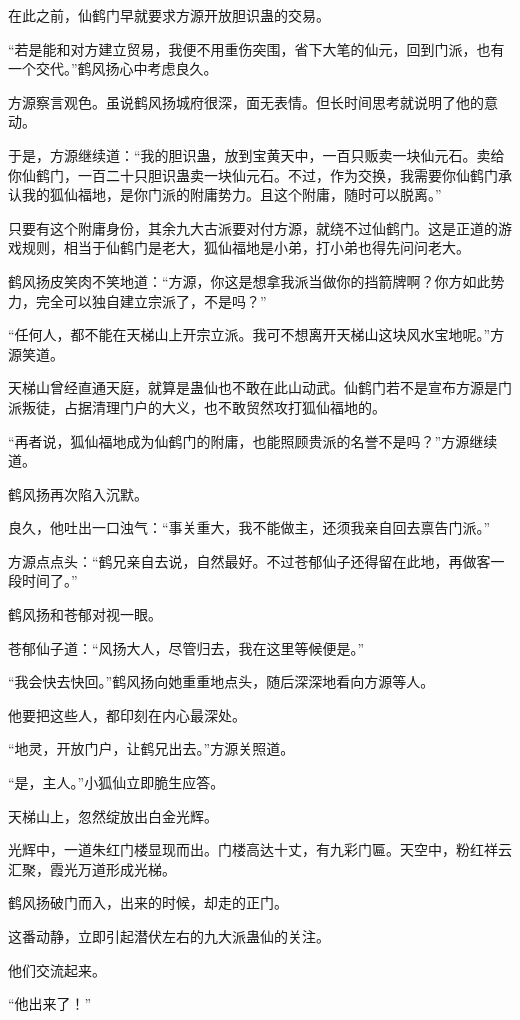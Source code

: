 \begin{this_body}
在此之前，仙鹤门早就要求方源开放胆识蛊的交易。

“若是能和对方建立贸易，我便不用重伤突围，省下大笔的仙元，回到门派，也有一个交代。”鹤风扬心中考虑良久。

方源察言观色。虽说鹤风扬城府很深，面无表情。但长时间思考就说明了他的意动。

于是，方源继续道：“我的胆识蛊，放到宝黄天中，一百只贩卖一块仙元石。卖给你仙鹤门，一百二十只胆识蛊卖一块仙元石。不过，作为交换，我需要你仙鹤门承认我的狐仙福地，是你门派的附庸势力。且这个附庸，随时可以脱离。”

只要有这个附庸身份，其余九大古派要对付方源，就绕不过仙鹤门。这是正道的游戏规则，相当于仙鹤门是老大，狐仙福地是小弟，打小弟也得先问问老大。

鹤风扬皮笑肉不笑地道：“方源，你这是想拿我派当做你的挡箭牌啊？你方如此势力，完全可以独自建立宗派了，不是吗？”

“任何人，都不能在天梯山上开宗立派。我可不想离开天梯山这块风水宝地呢。”方源笑道。

天梯山曾经直通天庭，就算是蛊仙也不敢在此山动武。仙鹤门若不是宣布方源是门派叛徒，占据清理门户的大义，也不敢贸然攻打狐仙福地的。

“再者说，狐仙福地成为仙鹤门的附庸，也能照顾贵派的名誉不是吗？”方源继续道。

鹤风扬再次陷入沉默。

良久，他吐出一口浊气：“事关重大，我不能做主，还须我亲自回去禀告门派。”

方源点点头：“鹤兄亲自去说，自然最好。不过苍郁仙子还得留在此地，再做客一段时间了。”

鹤风扬和苍郁对视一眼。

苍郁仙子道：“风扬大人，尽管归去，我在这里等候便是。”

“我会快去快回。”鹤风扬向她重重地点头，随后深深地看向方源等人。

他要把这些人，都印刻在内心最深处。

“地灵，开放门户，让鹤兄出去。”方源关照道。

“是，主人。”小狐仙立即脆生应答。

天梯山上，忽然绽放出白金光辉。

光辉中，一道朱红门楼显现而出。门楼高达十丈，有九彩门匾。天空中，粉红祥云汇聚，霞光万道形成光梯。

鹤风扬破门而入，出来的时候，却走的正门。

这番动静，立即引起潜伏左右的九大派蛊仙的关注。

他们交流起来。

“他出来了！”


\end{this_body}
